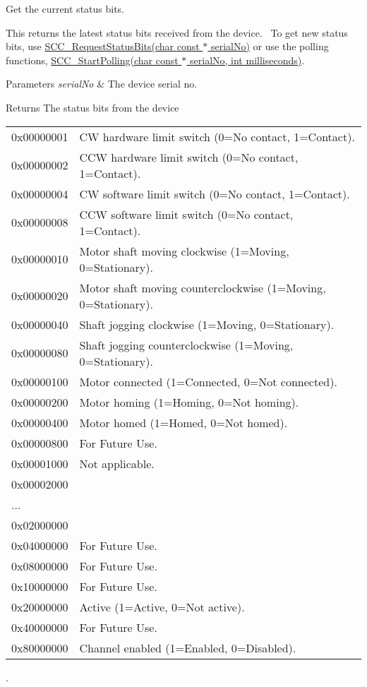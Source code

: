 Get the current status bits. 

This returns the latest status bits received from the device.~\newline
 To get new status bits, use \hyperlink{group___k_cube_stepper_gae7560b2a58ca48ff320eacc258555ba9}{S\+C\+C\+\_\+\+Request\+Status\+Bits(char const $\ast$ serial\+No)} or use the polling functions, \hyperlink{group___k_cube_stepper_ga2c3d1bae8f9cef2cf9d39e4c6950d96d}{S\+C\+C\+\_\+\+Start\+Polling(char const $\ast$ serial\+No, int milliseconds)}. 


\begin{DoxyParams}{Parameters}
{\em serial\+No} & The device serial no. \\
\hline
\end{DoxyParams}
\begin{DoxyReturn}{Returns}
The status bits from the device \tabulinesep=1mm
\begin{longtabu} spread 0pt [c]{*2{|X[-1]}|}
\hline
0x00000001&CW hardware limit switch (0=No contact, 1=Contact). \\
0x00000002&C\+CW hardware limit switch (0=No contact, 1=Contact). \\
0x00000004&CW software limit switch (0=No contact, 1=Contact). \\
0x00000008&C\+CW software limit switch (0=No contact, 1=Contact). \\
0x00000010&Motor shaft moving clockwise (1=Moving, 0=Stationary). \\
0x00000020&Motor shaft moving counterclockwise (1=Moving, 0=Stationary). \\
0x00000040&Shaft jogging clockwise (1=Moving, 0=Stationary). \\
0x00000080&Shaft jogging counterclockwise (1=Moving, 0=Stationary). \\
0x00000100&Motor connected (1=Connected, 0=Not connected). \\
0x00000200&Motor homing (1=Homing, 0=Not homing). \\
0x00000400&Motor homed (1=Homed, 0=Not homed). \\
0x00000800&For Future Use. \\
0x00001000&Not applicable. \\
0x00002000&\\
...&\\
0x02000000&\\
0x04000000&For Future Use. \\
0x08000000&For Future Use. \\
0x10000000&For Future Use. \\
0x20000000&Active (1=Active, 0=Not active). \\
0x40000000&For Future Use. \\
0x80000000&Channel enabled (1=Enabled, 0=Disabled). \\
\end{longtabu}
. 
\end{DoxyReturn}
